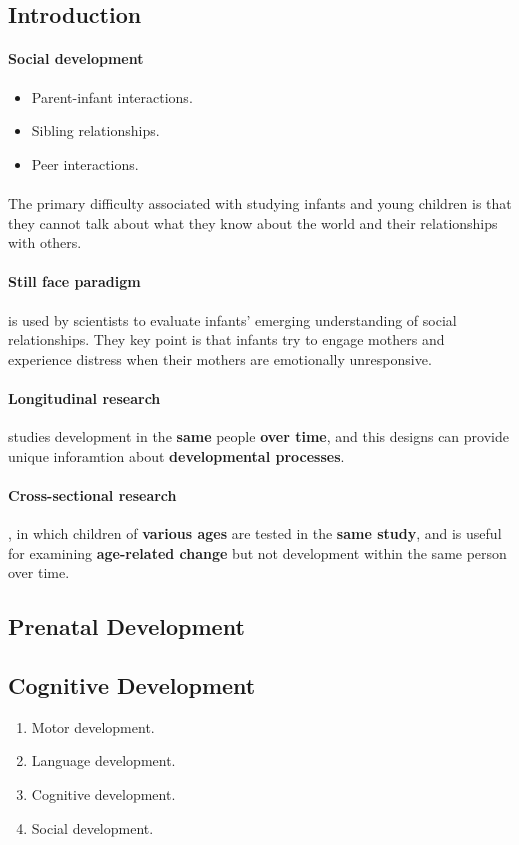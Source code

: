 \documentclass{article}
\begin{document}
	\subsection{Introduction}
	\paragraph{Social development}
	\begin{itemize}
		\item Parent-infant interactions.
		\item Sibling relationships.
		\item Peer interactions.
	\end{itemize}
	\paragraph{} The primary difficulty associated with studying infants and young children is that they cannot talk about what they know about the world and their relationships with others.
	\paragraph{Still face paradigm} is used by scientists to evaluate infants' emerging understanding of social relationships. They key point is that infants try to engage mothers and experience distress when their mothers are emotionally unresponsive.
	\paragraph{Longitudinal research} studies development in the \textbf{same} people \textbf{over time}, and this designs can provide unique inforamtion about \textbf{developmental processes}.
	\paragraph{Cross-sectional research}, in which children of \textbf{various ages} are tested in the \textbf{same study}, and is useful for examining \textbf{age-related change} but not development within the same person over time.
	\subsection{Prenatal Development}
	\subsection{Cognitive Development}
	\begin{enumerate}
		\item Motor development.
		\item Language development.
		\item Cognitive development.
		\item Social development.
	\end{enumerate}
	
\end{document}
